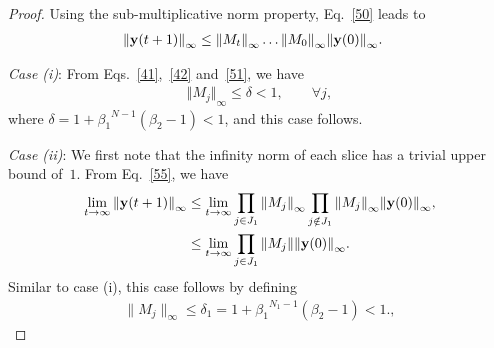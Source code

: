 \documentclass[draftclsnofoot, onecolumn, 12pt]{IEEEtran}
\begin{document}
\begin{proof}
Using the sub-multiplicative norm property, Eq.~\eqref{50} leads to
\begin{align}\label{55}
{\Vert{\bf{y}}(t+1)\Vert}_\infty &\leq {\Vert {{M}}_{t} \Vert}_{\infty}  \ldots {\Vert {{M}}_{0} \Vert}_{\infty} {\Vert {\bf{y}}(0) \Vert}_{\infty}.
\end{align}

\emph{Case (i)}: From Eqs.~\eqref{41},~\eqref{42} and~\eqref{51}, we have
\begin{eqnarray}
{{\Vert M_j \Vert}_{\infty}} \leq \delta < 1,\qquad\forall j,
\end{eqnarray}
where $\delta=1+{\beta_1}^{{N} - 1}({\beta}_2-1) <1$, and this case follows. 

\textit{Case (ii)}: We first note that the infinity norm of each slice has a trivial upper bound of~$1$. From Eq.~\eqref{55}, we have
\begin{align}
\lim_{t \rightarrow \infty}{\Vert {\bf{y}}(t+1) \Vert}_{\infty} &\leq \lim_{t \rightarrow \infty}\prod\limits_{j \in J_1} {\Vert{M}_{j}\Vert}_\infty \prod\limits_{j \notin J_1}{\Vert{M}_{j}\Vert}_\infty{\Vert {\bf{y}}(0) \Vert}_{\infty},\nonumber\\
&\leq \lim_{t \rightarrow \infty} \prod\limits_{j \in J_1} {\Vert{M}_{j}\Vert}{\Vert {\bf{y}}(0) \Vert}_{\infty}.
\end{align}
Similar to case (i), this case follows by defining
\begin{eqnarray*}
\|M_j\|_\infty\leq \delta_{1}=1+{\beta_1}^{{N_1} - 1}({\beta}_2-1) <1.,
\end{eqnarray*}


\end{proof}
\end{document}
